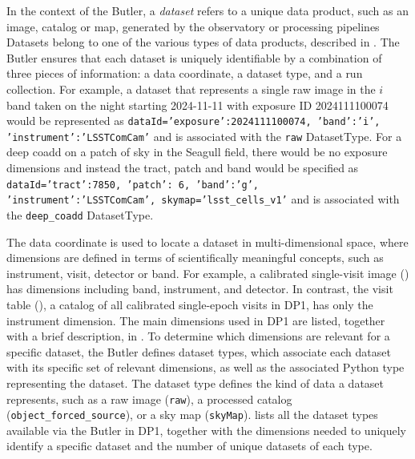 In the context of the \gls{Butler}, a \emph{dataset} refers to a unique data product, such as an image, catalog or map, generated by the observatory or processing pipelines
Datasets belong to one of the various types of data products, described in .
The \gls{Butler} ensures that each dataset is uniquely identifiable by a combination of three pieces of information: a data coordinate, a dataset type, and a run collection.
For example, a dataset that represents a single raw image  in the $i$ band taken on the night starting 2024-11-11 with exposure ID 2024111100074 would be represented as  
\texttt{dataId={'exposure':2024111100074, 'band':'i', 'instrument':'LSSTComCam'}} and is associated with the \texttt{raw} DatasetType.
For a deep coadd on a \gls{patch} of sky in the Seagull field, there would be no exposure dimensions and instead the tract, \gls{patch} and band would be specified as  \texttt{dataId={'tract':7850, 'patch': 6, 'band':'g', 'instrument':'LSSTComCam', skymap='lsst\_cells\_v1'}} and is associated with the \texttt{deep\_coadd} DatasetType.



The data coordinate is used to locate a dataset in multi-dimensional space, where dimensions are defined in terms of scientifically meaningful concepts, such as instrument, visit, detector or band.
For example, a calibrated single-visit image () has dimensions including band, instrument, and detector.
In contrast, the visit table (), a catalog of all calibrated single-epoch visits in \gls{DP1}, has only the instrument dimension.
The main dimensions used in \gls{DP1} are listed, together with a brief description, in .
To determine which dimensions are relevant for a specific dataset, the \gls{Butler} defines dataset types, which associate each dataset with its specific set of relevant dimensions, as well as the associated Python type representing the dataset.
The dataset type defines the kind of data a dataset represents, such as  a raw image  (\texttt{raw}), a processed catalog (\texttt{object\_forced\_source}), or a \gls{sky map} (\texttt{skyMap}).
 lists all the dataset types available via the Butler in DP1, together with the dimensions needed to uniquely identify a specific dataset and the number of unique datasets of each type. 

